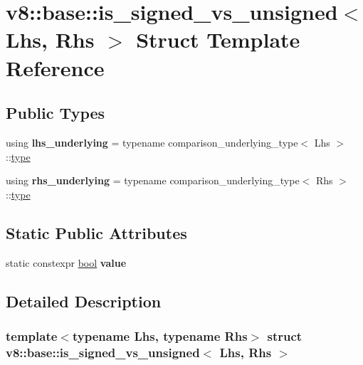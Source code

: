 \hypertarget{structv8_1_1base_1_1is__signed__vs__unsigned}{}\section{v8\+:\+:base\+:\+:is\+\_\+signed\+\_\+vs\+\_\+unsigned$<$ Lhs, Rhs $>$ Struct Template Reference}
\label{structv8_1_1base_1_1is__signed__vs__unsigned}
\subsection*{Public Types}
\begin{DoxyCompactItemize}
\item 
\mbox{\label{structv8_1_1base_1_1is__signed__vs__unsigned_ad972f732de2612e543f0e115baaa842b}} 
using {\bfseries lhs\+\_\+underlying} = typename comparison\+\_\+underlying\+\_\+type$<$ Lhs $>$\+::\mbox{\hyperlink{classstd_1_1conditional_1_1type}{type}}
\item 
\mbox{\label{structv8_1_1base_1_1is__signed__vs__unsigned_a61b91813dd9c699a982fe8666ea732da}} 
using {\bfseries rhs\+\_\+underlying} = typename comparison\+\_\+underlying\+\_\+type$<$ Rhs $>$\+::\mbox{\hyperlink{classstd_1_1conditional_1_1type}{type}}
\end{DoxyCompactItemize}
\subsection*{Static Public Attributes}
\begin{DoxyCompactItemize}
\item 
static constexpr \mbox{\hyperlink{classbool}{bool}} {\bfseries value}
\end{DoxyCompactItemize}


\subsection{Detailed Description}
\subsubsection*{template$<$typename Lhs, typename Rhs$>$\newline
struct v8\+::base\+::is\+\_\+signed\+\_\+vs\+\_\+unsigned$<$ Lhs, Rhs $>$}



